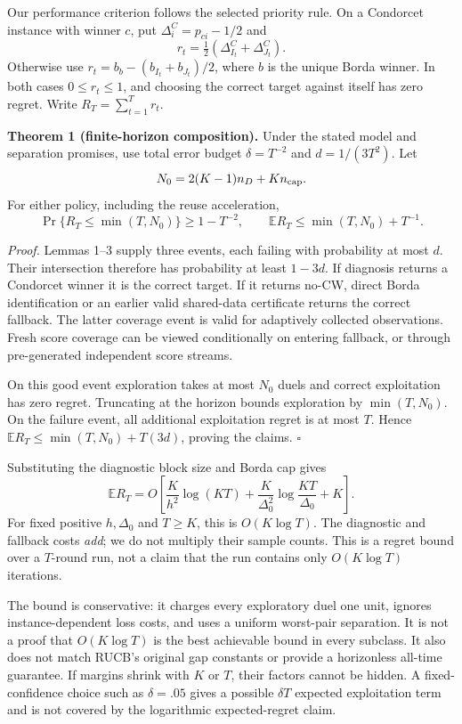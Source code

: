 \documentclass[11pt,a4paper]{article}
\newcommand{\E}{\mathbb E}
\begin{document}
Our performance criterion follows the selected priority rule. On a Condorcet instance with winner $c$, put $\Delta_i^C=p_{ci}-1/2$ and
\[
r_t=\tfrac12(\Delta_{I_t}^C+\Delta_{J_t}^C).
\]
Otherwise use $r_t=b_b-(b_{I_t}+b_{J_t})/2$, where $b$ is the unique Borda winner. In both cases $0\le r_t\le1$, and choosing the correct target against itself has zero regret. Write $R_T=\sum_{t=1}^T r_t$.

\textbf{Theorem 1 (finite-horizon composition).} Under the stated model and separation promises, use total error budget $\delta=T^{-2}$ and $d=1/(3T^2)$. Let
\[
N_0=2(K-1)n_D+Kn_{\rm cap}.
\]
For either policy, including the reuse acceleration,
\[
\Pr\{R_T\le\min(T,N_0)\}\ge1-T^{-2},\qquad
\E R_T\le\min(T,N_0)+T^{-1}.
\]

\emph{Proof.} Lemmas 1--3 supply three events, each failing with probability at most $d$. Their intersection therefore has probability at least $1-3d$. If diagnosis returns a Condorcet winner it is the correct target. If it returns no-CW, direct Borda identification or an earlier valid shared-data certificate returns the correct fallback. The latter coverage event is valid for adaptively collected observations. Fresh score coverage can be viewed conditionally on entering fallback, or through pre-generated independent score streams.

On this good event exploration takes at most $N_0$ duels and correct exploitation has zero regret. Truncating at the horizon bounds exploration by $\min(T,N_0)$. On the failure event, all additional exploitation regret is at most $T$. Hence $\E R_T\le\min(T,N_0)+T(3d)$, proving the claims. \hfill$\square$

Substituting the diagnostic block size and Borda cap gives
\[
\E R_T=O\!\left[
\frac K{h^2}\log(KT)
+\frac K{\Delta_0^2}\log\frac{KT}{\Delta_0}+K\right].
\]
For fixed positive $h,\Delta_0$ and $T\ge K$, this is $O(K\log T)$. The diagnostic and fallback costs \emph{add}; we do not multiply their sample counts. This is a regret bound over a $T$-round run, not a claim that the run contains only $O(K\log T)$ iterations.

The bound is conservative: it charges every exploratory duel one unit, ignores instance-dependent loss costs, and uses a uniform worst-pair separation. It is not a proof that $O(K\log T)$ is the best achievable bound in every subclass. It also does not match RUCB's original gap constants or provide a horizonless all-time guarantee. If margins shrink with $K$ or $T$, their factors cannot be hidden. A fixed-confidence choice such as $\delta=.05$ gives a possible $\delta T$ expected exploitation term and is not covered by the logarithmic expected-regret claim.
\end{document}
